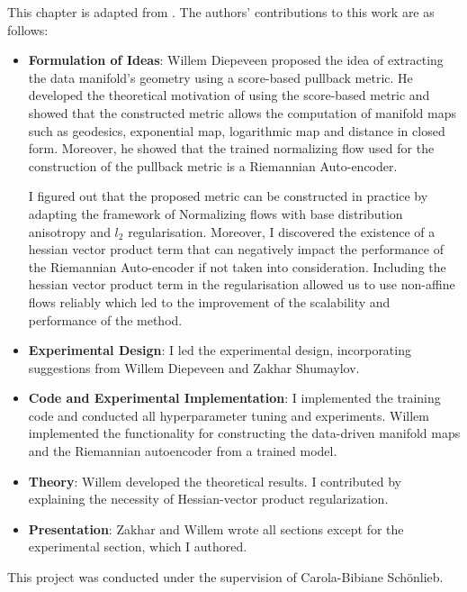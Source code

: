 This chapter is adapted from \cite{diepeveen2024score}. The authors' contributions to this work are as follows:

\begin{itemize}
\item \textbf{Formulation of Ideas}: Willem Diepeveen proposed the idea of extracting the data manifold's geometry using a score-based pullback metric. He developed the theoretical motivation of using the score-based metric and showed that the constructed metric allows the computation of manifold maps such as geodesics, exponential map, logarithmic map and distance in closed form. Moreover, he showed that the trained normalizing flow used for the construction of the pullback metric is a Riemannian Auto-encoder.

I figured out that the proposed metric can be constructed in practice by adapting the framework of Normalizing flows with base distribution anisotropy and $l_2$ regularisation. Moreover, I discovered the existence of a hessian vector product term that can negatively impact the performance of the Riemannian Auto-encoder if not taken into consideration. 
Including the hessian vector product term in the regularisation allowed us to use non-affine flows reliably which led to the improvement of the scalability and performance of the method.

\item \textbf{Experimental Design}: I led the experimental design, incorporating suggestions from Willem Diepeveen and Zakhar Shumaylov.
\item \textbf{Code and Experimental Implementation}: I implemented the training code and conducted all hyperparameter tuning and experiments. Willem implemented the functionality for constructing the data-driven manifold maps and the Riemannian autoencoder from a trained model.
\item \textbf{Theory}: Willem developed the theoretical results. I contributed by explaining the necessity of Hessian-vector product regularization.
\item \textbf{Presentation}: Zakhar and Willem wrote all sections except for the experimental section, which I authored.
\end{itemize}

This project was conducted under the supervision of Carola-Bibiane Sch\"onlieb.